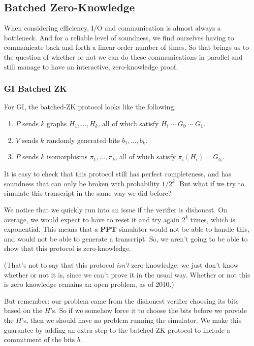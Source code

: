 \documentclass[11pt]{article}
\newcommand{\PPT}{\mathbf{PPT}}
\begin{document}
\subsection{Batched Zero-Knowledge}
When considering efficiency, I/O and communication is almost always a bottleneck. And for a reliable level of soundness, we find ourselves having to communicate back and forth a linear-order number of times. So that brings us to the question of whether or not we can do these communications in parallel and still manage to have an interactive, zero-knowledge proof.\bigskip

\subsubsection{GI Batched ZK}
For GI, the batched-ZK protocol looks like the following:
\begin{enumerate}
\item \(P\) sends \(k\) graphs \(H_1,\ldots,H_k\), all of which satisfy \(H_i\sim G_0\sim G_1\).
\item \(V\) sends \(k\) randomly generated bits \(b_1,\ldots,b_k\).
\item \(P\) sends \(k\) isomorphisms \(\pi_1,\ldots,\pi_k\), all of which satisfy \(\pi_i(H_i) = G_{b_i}\).
\end{enumerate}

It is easy to check that this protocol still has perfect completeness, and has soundness that can only be broken with probability \(1/2^k\). But what if we try to simulate this transcript in the same way we did before?\medskip

We notice that we quickly run into an issue if the verifier is dishonest. On average, we would expect to have to reset it and try again \(2^k\) times, which is exponential. This means that a \(\PPT\) simulator would not be able to handle this, and would not be able to generate a transcript. So, we aren't going to be able to show that this protocol is zero-knowledge. \smallskip

(That's not to say that this protocol \emph{isn't} zero-knowledge; we just don't know whether or not it is, since we can't prove it in the usual way. Whether or not this is zero knowledge remains an open problem, as of 2010.)\bigskip

But remember: our problem came from the dishonest verifier choosing its bits based on the \(H\)'s. So if we somehow force it to choose the bits before we provide the \(H\)'s, then we should have no problem running the simulator. We make this guarantee by adding an extra step to the batched ZK protocol to include a commitment of the bits \(b\).
\end{document}
